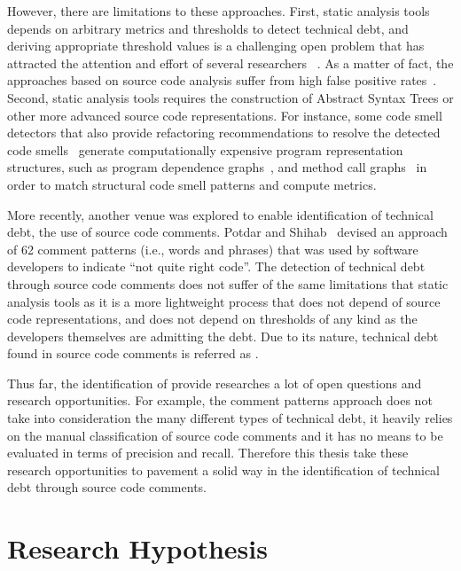 However, there are limitations to these approaches. First, static analysis tools depends on arbitrary metrics and thresholds to detect technical debt, and deriving appropriate threshold values is a challenging open problem that has attracted the attention and effort of several researchers ~\cite{Oliveira2014CSMR,Fontana2015WETSoM,Fontana2015EMSE}. As a matter of fact, the approaches based on source code analysis suffer from high false positive rates~\cite{Fontana2016SANER}. Second, static analysis tools requires the construction of Abstract Syntax Trees or other more advanced source code representations. For instance, some code smell detectors that also provide refactoring recommendations to resolve the detected code smells~\cite{Tsantalis2011TSE,Tsantalis2015TSE} generate computationally expensive program representation structures, such as program dependence graphs~\cite{Graf2010SCAM}, and method call graphs~\cite{Ali2012ECOOP} in order to match structural code smell patterns and compute metrics.

More recently, another venue was explored to enable identification of technical debt, the use of source code comments. Potdar and Shihab~\cite{Potdar2014ICSME} devised an approach of 62 comment patterns (i.e., words and phrases) that was used by software developers to indicate ``not quite right code''. The detection of technical debt through source code comments does not suffer of the same limitations that static analysis tools as it is a more lightweight process that does not depend of source code representations, and does not depend on thresholds of any kind as the developers themselves are admitting the debt. Due to its nature, technical debt found in source code comments is referred as \emph{\SATD}.

Thus far, the identification of \SATD provide researches a lot of open questions and research opportunities. For example, the comment patterns approach does not take into consideration the many different types of technical debt, it heavily relies on the manual classification of source code comments and it has no means to be evaluated in terms of precision and recall. Therefore this thesis take these research opportunities to pavement a solid way in the identification of technical debt through source code comments. 

\section{Research Hypothesis}

